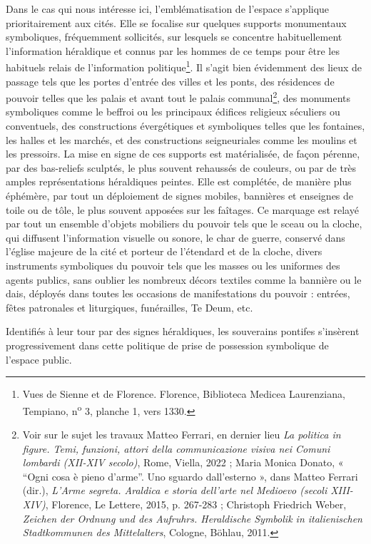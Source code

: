 \documentclass[12pt,twoside,openany]{book}
\begin{document}
Dans le cas qui nous intéresse ici, l’emblématisation de l’espace s’applique prioritairement aux cités. Elle se focalise sur quelques supports monumentaux symboliques, fréquemment sollicités, sur lesquels se concentre habituellement l’information héraldique et connus par les hommes de ce temps pour être les habituels relais de l’information politique\footnote{Vues de Sienne et de Florence. Florence, Biblioteca Medicea Laurenziana, Tempiano, n\textsuperscript{o} 3, planche 1, vers 1330.}. Il s’agit bien évidemment des lieux de passage tels que les portes d’entrée des villes et les ponts, des résidences de pouvoir telles que les palais et avant tout le palais communal\footnote{Voir sur le sujet les travaux Matteo Ferrari, en dernier lieu \textit{La politica in figure. Temi, funzioni, attori della communicazione visiva nei Comuni lombardi (XII-XIV secolo)}, Rome, Viella, 2022 ; Maria Monica Donato, « “Ogni cosa è pieno d’arme”. Uno sguardo dall’esterno », dans Matteo Ferrari (dir.), \textit{L’Arme segreta. Araldica e storia dell’arte nel Medioevo (secoli XIII-XIV)}, Florence, Le Lettere, 2015, p. 267-283 ; Christoph Friedrich Weber, \textit{Zeichen der Ordnung und des Aufruhrs. Heraldische Symbolik in italienischen Stadtkommunen des Mittelalters}, Cologne, Böhlau, 2011.}, des monuments symboliques comme le beffroi ou les principaux édifices religieux séculiers ou conventuels, des constructions évergétiques et symboliques telles que les fontaines, les halles et les marchés, et des constructions seigneuriales comme les moulins et les pressoirs. La mise en signe de ces supports est matérialisée, de façon pérenne, par des bas-reliefs sculptés, le plus souvent rehaussés de couleurs, ou par de très amples représentations héraldiques peintes. Elle est complétée, de manière plus éphémère, par tout un déploiement de signes mobiles, bannières et enseignes de toile ou de tôle, le plus souvent apposées sur les faîtages. Ce marquage est relayé par tout un ensemble d’objets mobiliers du pouvoir tels que le sceau ou la cloche, qui diffusent l’information visuelle ou sonore, le char de guerre, conservé dans l’église majeure de la cité et porteur de l’étendard et de la cloche, divers instruments symboliques du pouvoir tels que les masses ou les uniformes des agents publics, sans oublier les nombreux décors textiles comme la bannière ou le dais, déployés dans toutes les occasions de manifestations du pouvoir : entrées, fêtes patronales et liturgiques, funérailles, Te Deum, etc.

Identifiés à leur tour par des signes héraldiques, les souverains pontifes s’insèrent progressivement dans cette politique de prise de possession symbolique de l’espace public.
\end{document}
